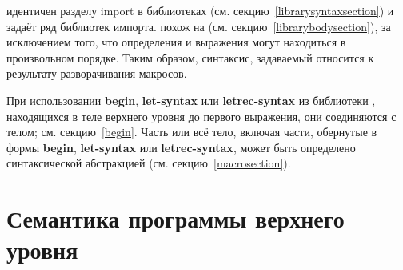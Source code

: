  идентичен разделу import в библиотеках
(см. секцию~\ref{librarysyntaxsection}) и задаёт ряд библиотек импорта. 
похож на  (см. секцию~\ref{librarybodysection}), за исключением того, что
определения и выражения могут находиться в произвольном порядке. Таким образом, синтаксис,
задаваемый  относится к результату разворачивания макросов.

При использовании {\bfseries\cf begin}, {\bfseries\cf let-syntax} или {\bfseries\cf
  letrec-syntax} из библиотеки \textbf{}, находящихся в теле верхнего уровня
до первого выражения, они соединяются с телом; см. секцию~\ref{begin}. Часть или всё тело,
включая части, обернутые в формы {\bfseries\cf begin}, {\bfseries\cf let-syntax} или
{\bfseries\cf letrec-syntax}, может быть определено синтаксической абстракцией
(см. секцию~\ref{macrosection}).

\section{Семантика программы верхнего уровня}\vspace{1mm}

